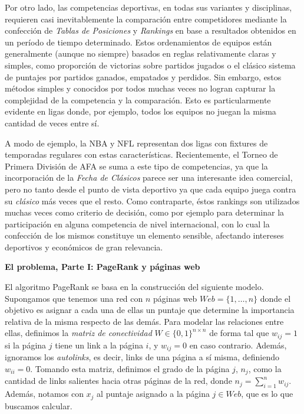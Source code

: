 \documentclass[11pt, a4paper]{article}
\begin{document}
Por otro lado, las competencias deportivas, en todas sus variantes y disciplinas, requieren casi inevitablemente la comparaci\'on entre competidores
mediante la confecci\'on de \emph{Tablas de Posiciones} y \emph{Rankings} en base a resultados obtenidos en un per\'iodo de tiempo determinado. 
Estos ordenamientos de equipos est\'an generalmente (aunque no siempre) basados en reglas relativamente claras y simples, como proporci\'on 
de victorias sobre partidos jugados o el cl\'asico sistema de puntajes por partidos ganados, empatados y perdidos. Sin embargo, estos m\'etodos
simples y conocidos por todos muchas veces no logran capturar la complejidad de la competencia y la comparaci\'on. Esto es particularmente
evidente en ligas donde, por ejemplo, todos los equipos no juegan la misma cantidad de veces entre s\'i.

A modo de ejemplo, la NBA y NFL representan dos ligas con fixtures de temporadas regulares con estas caracter\'isticas. Recientemente, el Torneo de 
Primera Divisi\'on de AFA se suma a este tipo de competencias, ya que la incorporaci\'on de la \emph{Fecha de Cl\'asicos} parece ser una interesante 
idea comercial, pero no tanto desde el punto de vista deportivo ya que cada equipo juega contra su \emph{cl\'asico} m\'as veces que el resto. 
Como contraparte, \'estos rankings son utilizados muchas veces como criterio de decisi\'on, como por ejemplo para determinar la participaci\'on en 
alguna competencia de nivel internacional, con lo cual la confecci\'on de los mismos constituye un elemento sensible, afectando intereses deportivos 
y econ\'omicos de gran relevancia.


\vskip 5pt
\noindent\textbf{El problema, Parte I: PageRank y p\'aginas web}
\vskip 5pt

El algoritmo PageRank se basa en la construcci\'on del siguiente modelo. Supongamos que tenemos una red con $n$ p\'aginas 
web $Web = \{1,\dots,n\}$ donde
el objetivo es asignar a cada una de ellas un puntaje que determine la importancia relativa de la misma respecto de las
dem\'as. Para modelar las relaciones entre ellas, definimos la \emph{matriz de conectividad} $W \in \{0,1\}^{n \times n}$ 
de forma tal que $w_{ij} = 1$ si la p\'agina $j$ tiene un link a la p\'agina $i$, y $w_{ij} = 0$ en caso contrario. 
Adem\'as, ignoramos los \emph{autolinks}, es decir, links de una p\'agina a s\'i misma, definiendo $w_{ii} = 0$. Tomando 
esta matriz, definimos el grado de la p\'agina $j$, $n_j$, como la cantidad de links salientes hacia otras p\'aginas 
de la red, donde $n_j = \sum_{i = 1}^n w_{ij}$. Adem\'as, notamos con $x_j$ al puntaje asignado a la p\'agina $j\in
Web$, que es lo que buscamos calcular.
\end{document}
